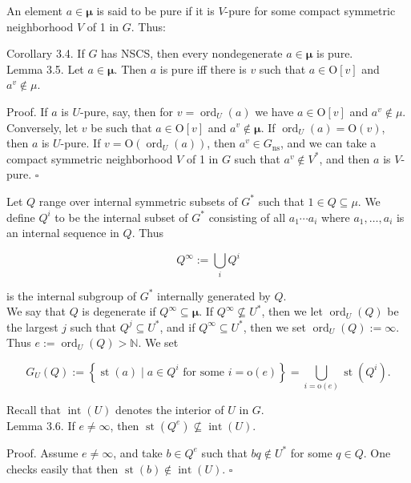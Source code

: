 \documentclass[10pt]{article}
\begin{document}
An element $a \in \boldsymbol{\mu}$ is said to be pure if it is $V$-pure for some compact symmetric neighborhood $V$ of 1 in $G$. Thus:

Corollary 3.4. If $G$ has NSCS, then every nondegenerate $a \in \boldsymbol{\mu}$ is pure.\\
Lemma 3.5. Let $a \in \boldsymbol{\mu}$. Then $a$ is pure iff there is $v$ such that $a \in \mathrm{O}[v]$ and $a^{v} \notin \mu$.

Proof. If $a$ is $U$-pure, say, then for $v=\operatorname{ord}_{U}(a)$ we have $a \in \mathrm{O}[v]$ and $a^{v} \notin \mu$. Conversely, let $v$ be such that $a \in \mathrm{O}[v]$ and $a^{v} \notin \boldsymbol{\mu}$. If $\operatorname{ord}_{U}(a)=\mathrm{O}(v)$, then $a$ is $U$-pure. If $v=\mathrm{O}\left(\operatorname{ord}_{U}(a)\right)$, then $a^{v} \in G_{\mathrm{ns}}$, and we can take a compact symmetric neighborhood $V$ of 1 in $G$ such that $a^{v} \notin V^{*}$, and then $a$ is $V$-pure. \(\square\)

Let $Q$ range over internal symmetric subsets of $G^{*}$ such that $1 \in Q \subseteq \mu$. We define $Q^{i}$ to be the internal subset of $G^{*}$ consisting of all $a_{1} \cdots a_{i}$ where $a_{1}, \ldots, a_{i}$ is an internal sequence in $Q$. Thus

$$
Q^{\infty}:=\bigcup_{i} Q^{i}
$$

is the internal subgroup of $G^{*}$ internally generated by $Q$.\\
We say that $Q$ is degenerate if $Q^{\infty} \subseteq \boldsymbol{\mu}$. If $Q^{\infty} \nsubseteq U^{*}$, then we let $\operatorname{ord}_{U}(Q)$ be the largest $j$ such that $Q^{j} \subseteq U^{*}$, and if $Q^{\infty} \subseteq U^{*}$, then we set $\operatorname{ord}_{U}(Q):=\infty$. Thus $e:=\operatorname{ord}_{U}(Q)>\mathbb{N}$. We set

$$
G_{U}(Q):=\left\{\operatorname{st}(a) \mid a \in Q^{i} \text { for some } i=\mathrm{o}(e)\right\}=\bigcup_{i=\mathrm{o}(e)} \operatorname{st}\left(Q^{i}\right) .
$$

Recall that $\operatorname{int}(U)$ denotes the interior of $U$ in $G$.\\
Lemma 3.6. If $e \neq \infty$, then $\operatorname{st}\left(Q^{e}\right) \nsubseteq \operatorname{int}(U)$.

Proof. Assume $e \neq \infty$, and take $b \in Q^{e}$ such that $b q \notin U^{*}$ for some $q \in Q$. One checks easily that then $\operatorname{st}(b) \notin \operatorname{int}(U)$. \(\square\)
\end{document}

